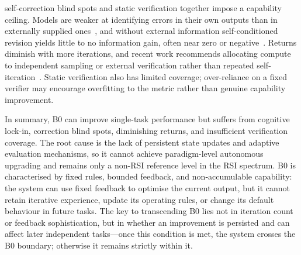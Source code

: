 self-correction blind spots and static verification together impose a capability ceiling. Models are weaker at identifying errors in their own outputs than in externally supplied ones~\cite{tsui2026selfcorrectionbenchuncoveringaddressing}, and without external information self-conditioned revision yields little to no information gain, often near zero or negative~\cite{li2026decomposing}. Returns diminish with more iterations, and recent work recommends allocating compute to independent sampling or external verification rather than repeated self-iteration~\cite{olausson2024self,verma2026blindresampling}. Static verification also has limited coverage; over-reliance on a fixed verifier may encourage overfitting to the metric rather than genuine capability improvement.

In summary, B0 can improve single-task performance but suffers from cognitive lock-in, correction blind spots, diminishing returns, and insufficient verification coverage. The root cause is the lack of persistent state updates and adaptive evaluation mechanisms, so it cannot achieve paradigm-level autonomous upgrading and remains only a non-RSI reference level in the RSI spectrum. B0 is characterised by fixed rules, bounded feedback, and non‑accumulable capability: the system can use fixed feedback to optimise the current output, but it cannot retain iterative experience, update its operating rules, or change its default behaviour in future tasks. The key to transcending B0 lies not in iteration count or feedback sophistication, but in whether an improvement is persisted and can affect later independent tasks---once this condition is met, the system crosses the B0 boundary; otherwise it remains strictly within it.
\fi





